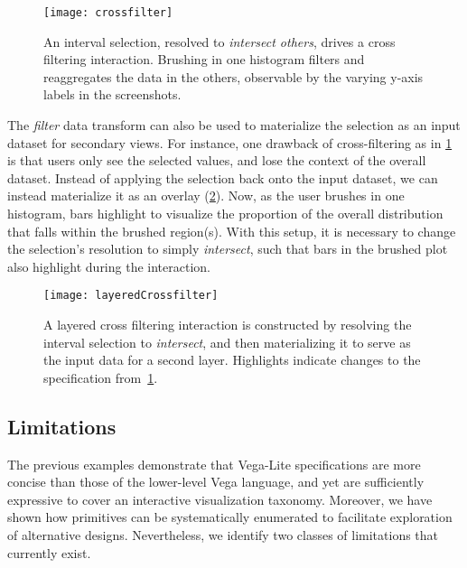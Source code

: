 \begin{figure}[h!]
  \centering
  \texttt{[image: crossfilter]}
  \caption{An interval selection, resolved to \emph{intersect others}, drives a
  cross filtering interaction. Brushing in one histogram filters and
  reaggregates the data in the others, observable by the varying y-axis labels
  in the screenshots.}
  \label{fig:vl:crossfilter}
\end{figure}

The \emph{filter} data transform can also be used to materialize the selection
as an input dataset for secondary views. For instance, one drawback of
cross-filtering as in \cref{fig:vl:crossfilter} is that users only see the
selected values, and lose the context of the overall dataset. Instead of
applying the selection back onto the input dataset, we can instead materialize
it as an overlay (\cref{fig:vl:layeredCrossfilter}). Now, as the user brushes in
one histogram, bars highlight to visualize the proportion of the overall
distribution that falls within the brushed region(s). With this setup, it is
necessary to change the selection's resolution to simply \emph{intersect}, such
that bars in the brushed plot also highlight during the interaction.

\begin{figure}[h!]
  \centering
  \texttt{[image: layeredCrossfilter]}
  \caption{A layered cross filtering interaction is constructed by resolving
  the interval selection to \emph{intersect}, and then materializing it to
  serve as the input data for a second layer. Highlights indicate changes to
  the specification from~\cref{fig:vl:crossfilter}.}
  \label{fig:vl:layeredCrossfilter}
\end{figure}

\vspace{-10pt}

\subsection{Limitations}

\vspace{-7pt}

The previous examples demonstrate that Vega-Lite specifications are more concise
than those of the lower-level Vega language, and yet are sufficiently expressive
to cover an interactive visualization taxonomy. Moreover, we have shown how
primitives can be systematically enumerated to facilitate exploration of
alternative designs. Nevertheless, we identify two classes of limitations that
currently exist.

